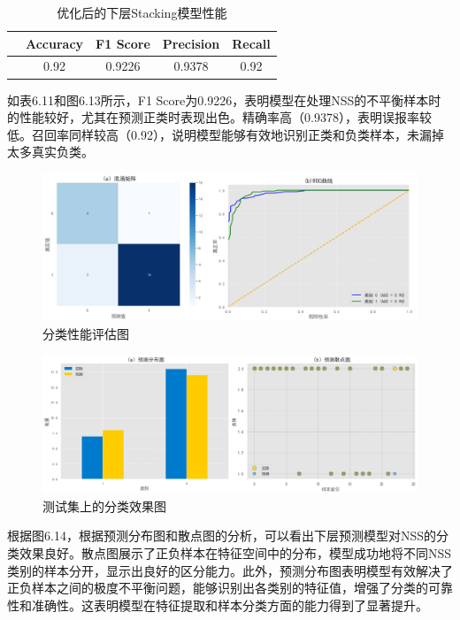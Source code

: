 \begin{table}[H]
	\centering
	\caption{优化后的下层Stacking模型性能}
	\begin{tabular}{lcccc}
		\toprule
		& Accuracy & F1 Score & Precision & Recall \\
		\midrule
		& 0.92 & 0.9226 & 0.9378 & 0.92 \\
		\bottomrule
	\end{tabular}
\end{table}

如表6.11和图6.13所示，F1 Score为0.9226，表明模型在处理NSS的不平衡样本时的性能较好，尤其在预测正类时表现出色。精确率高（0.9378），表明误报率较低。召回率同样较高（0.92），说明模型能够有效地识别正类和负类样本，未漏掉太多真实负类。


\begin{figure}[H]
	\centering
	\includegraphics[width=1\linewidth]{figures/问题24}
	\caption{分类性能评估图}
	\label{fig:24}
\end{figure}


\begin{figure}[H]
	\centering
	\includegraphics[width=1\linewidth]{figures/问题25}
	\caption{测试集上的分类效果图}
	\label{fig:23}
\end{figure}

根据图6.14，根据预测分布图和散点图的分析，可以看出下层预测模型对NSS的分类效果良好。散点图展示了正负样本在特征空间中的分布，模型成功地将不同NSS类别的样本分开，显示出良好的区分能力。此外，预测分布图表明模型有效解决了正负样本之间的极度不平衡问题，能够识别出各类别的特征值，增强了分类的可靠性和准确性。这表明模型在特征提取和样本分类方面的能力得到了显著提升。
